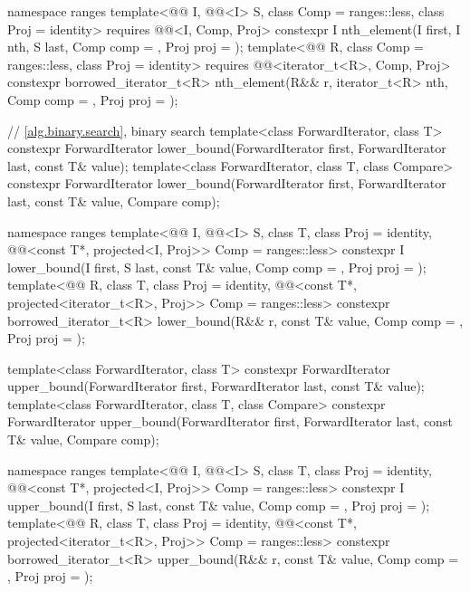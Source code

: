 \begin{codeblock}
{  namespace ranges {
    template<@@ I, @@<I> S, class Comp = ranges::less,
             class Proj = identity>
      requires @@<I, Comp, Proj>
      constexpr I
        nth_element(I first, I nth, S last, Comp comp = {}, Proj proj = {});
    template<@@ R, class Comp = ranges::less, class Proj = identity>
      requires @@<iterator_t<R>, Comp, Proj>
      constexpr borrowed_iterator_t<R>
        nth_element(R&& r, iterator_t<R> nth, Comp comp = {}, Proj proj = {});
  }

  // \ref{alg.binary.search}, binary search
  template<class ForwardIterator, class T>
    constexpr ForwardIterator
      lower_bound(ForwardIterator first, ForwardIterator last,
                  const T& value);
  template<class ForwardIterator, class T, class Compare>
    constexpr ForwardIterator
      lower_bound(ForwardIterator first, ForwardIterator last,
                  const T& value, Compare comp);

  namespace ranges {
    template<@@ I, @@<I> S, class T, class Proj = identity,
             @@<const T*, projected<I, Proj>> Comp = ranges::less>
      constexpr I lower_bound(I first, S last, const T& value, Comp comp = {},
                              Proj proj = {});
    template<@@ R, class T, class Proj = identity,
             @@<const T*, projected<iterator_t<R>, Proj>> Comp =
               ranges::less>
      constexpr borrowed_iterator_t<R>
        lower_bound(R&& r, const T& value, Comp comp = {}, Proj proj = {});
  }

  template<class ForwardIterator, class T>
    constexpr ForwardIterator
      upper_bound(ForwardIterator first, ForwardIterator last,
                  const T& value);
  template<class ForwardIterator, class T, class Compare>
    constexpr ForwardIterator
      upper_bound(ForwardIterator first, ForwardIterator last,
                  const T& value, Compare comp);

  namespace ranges {
    template<@@ I, @@<I> S, class T, class Proj = identity,
             @@<const T*, projected<I, Proj>> Comp = ranges::less>
      constexpr I upper_bound(I first, S last, const T& value, Comp comp = {}, Proj proj = {});
    template<@@ R, class T, class Proj = identity,
             @@<const T*, projected<iterator_t<R>, Proj>> Comp =
               ranges::less>
      constexpr borrowed_iterator_t<R>
        upper_bound(R&& r, const T& value, Comp comp = {}, Proj proj = {});
  }

}
\end{codeblock}
